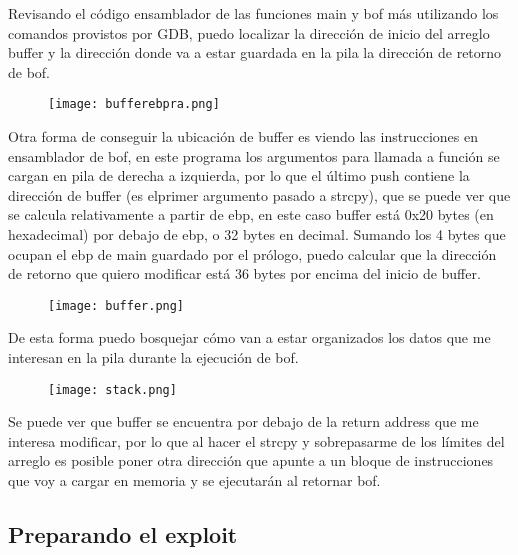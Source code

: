 \documentclass[11pt]{article}
\begin{document}
Revisando el código ensamblador de las funciones main y bof más utilizando los comandos
provistos por GDB, puedo localizar la dirección de inicio del arreglo buffer y 
la dirección donde va a estar guardada en la pila la dirección de retorno de bof.

\begin{figure}[h!]
    \begin{center}
        \texttt{[image: bufferebpra.png]}
    \end{center}
\end{figure}

Otra forma de conseguir la ubicación de buffer es viendo las instrucciones en
ensamblador de bof, en este programa los argumentos para llamada a función
se cargan en pila de derecha a izquierda, por lo que el último push contiene
la dirección de buffer (es elprimer argumento pasado a strcpy),
que se puede ver que se calcula relativamente a partir de ebp,
en este caso buffer está 0x20 bytes (en hexadecimal) por debajo de ebp,
o 32 bytes en decimal. Sumando los 4 bytes que ocupan el ebp de main guardado
por el prólogo, puedo calcular que la dirección de retorno que quiero modificar
está 36 bytes por encima del inicio de buffer.

\begin{figure}[h!]
    \begin{center}
        \texttt{[image: buffer.png]}
    \end{center}
\end{figure}

De esta forma puedo bosquejar cómo van a estar organizados los datos que me
interesan en la pila durante la ejecución de bof.

\begin{figure}[h!]
    \begin{center}
        \texttt{[image: stack.png]}
    \end{center}
\end{figure}

\newpage
Se puede ver que buffer se encuentra por debajo de la return address que me interesa
modificar, por lo que al hacer el strcpy y sobrepasarme de los límites del arreglo
es posible poner otra dirección que apunte a un bloque de instrucciones que voy
a cargar en memoria y se ejecutarán al retornar bof.

\subsection*{Preparando el exploit}
\end{document}
